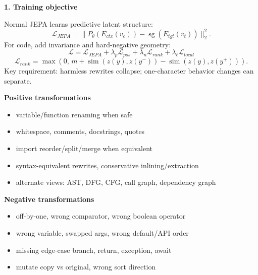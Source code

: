 \documentclass[9pt]{article}
\newcommand{\sg}{\operatorname{sg}}
\newcommand{\simfn}{\operatorname{sim}}
\begin{document}
\vspace{0.25em}
\begin{minipage}[t]{0.325\linewidth}
\textbf{1. Training objective}\vspace{0.2em}

Normal JEPA learns predictive latent structure:
\[
\mathcal L_{JEPA}=\|P_\theta(E_{ctx}(v_c))-\sg(E_{tgt}(v_t))\|_2^2.
\]
For code, add invariance and hard-negative geometry:
\[
\mathcal L=\mathcal L_{JEPA}+\lambda_p\mathcal L_{pos}+\lambda_n\mathcal L_{rank}+\lambda_\ell\mathcal L_{local}
\]
\[
\mathcal L_{rank}=\max(0,\,m+\simfn(z(y),z(y^-))-\simfn(z(y),z(y^+))).
\]
Key requirement: harmless rewrites collapse; one-character behavior changes can separate.

\vspace{0.3em}
\textbf{Positive transformations}\vspace{-0.2em}
\begin{itemize}
\item variable/function renaming when safe
\item whitespace, comments, docstrings, quotes
\item import reorder/split/merge when equivalent
\item syntax-equivalent rewrites, conservative inlining/extraction
\item alternate views: AST, DFG, CFG, call graph, dependency graph
\end{itemize}

\textbf{Negative transformations}\vspace{-0.2em}
\begin{itemize}
\item off-by-one, wrong comparator, wrong boolean operator
\item wrong variable, swapped args, wrong default/API order
\item missing edge-case branch, return, exception, await
\item mutate copy vs original, wrong sort direction
\end{itemize}
\end{minipage}\hfill
\end{document}
